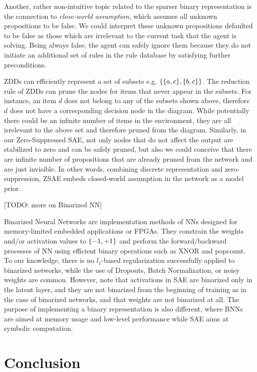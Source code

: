 Another, rather non-intuitive topic related to the sparser binary representation
is the connection to \emph{close-world assumption}, which assumes all unknown
propositions to be false.
% 
We could interpret these unknown propositions defaulted to be false as those which are irrelevant
to the current task that the agent is solving.
Being always false, the agent can safely ignore them because
they do not initiate an additional set of rules in the rule database by satisfying further preconditions.

ZDDs can efficiently represent a set of subsets e.g. ${\left\{{\left\{a,c\right\}},{\left\{b,c\right\}}\right\}}$.
The reduction rule of ZDDs can prune the nodes for items that never appear in the subsets.
For instance, an item $d$ does not belong to any of the subsets shown above, therefore $d$ does not have
a corresponding decision node in the diagram.
While potentially there could be an infinite number of items in the environment, they are 
all irrelevant to the above set and therefore pruned from the diagram.
% 
Similarly, in our Zero-Suppressed SAE, not only nodes that do not affect the output are stabilized to zero
and can be safely pruned, but also we could conceive that there are infinite number of propositions
that are already pruned from the network and are just invisible.
In other words, combining discrete representation and zero-suppression,
ZSAE embeds closed-world assumption in the network as a model prior.

[TODO: more on Binarized NN]

Binarized Neural Networks \cite{courbariaux2015binaryconnect,HubaraCSEB16,rastegari2016xnor}
 are implementation methods of NNs designed for
memory-limited embedded applications or FPGAs. They constrain the weights and/or activation
values to ${\left\{-1,+1\right\}}$ and perform the forward/backward processes of NN using
efficient binary operations such as XNOR and popcount.
To our knowledge, there is no $l_1$-based regularization successfully
applied to binarized networks, while the use of Dropouts, Batch Normalization, 
or noisy weights \cite{HubaraCSEB16} are common.
However, note that activations in SAE are binarized only in the latent layer,
and they are not binarized from the beginning of training
 as in the case of binarized networks, and that weights are not binarized at all.
The purpose of implementing a binary representation is also different, where BNNs
are aimed at memory usage and low-level performance while SAE aims at symbolic computation.

\section{Conclusion}
\label{conclusion}

